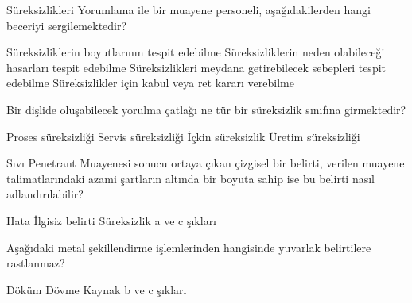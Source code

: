 \begin{question}[subtitle=]
Süreksizlikleri Yorumlama ile bir muayene personeli, aşağıdakilerden hangi beceriyi sergilemektedir?
	\begin{tasks}
          \task Süreksizliklerin boyutlarının tespit edebilme
          \task Süreksizliklerin neden olabileceği hasarları tespit edebilme
          \task Süreksizlikleri meydana getirebilecek sebepleri tespit edebilme \correct
          \task Süreksizlikler için kabul veya ret kararı verebilme
	\end{tasks}
\end{question}
\begin{solution}
	\correct
\end{solution}

\begin{question}[subtitle=]
Bir dişlide oluşabilecek yorulma çatlağı ne tür bir süreksizlik sınıfına girmektedir?
	\begin{tasks}
          \task Proses süreksizliği
          \task Servis süreksizliği \correct
          \task İçkin süreksizlik
          \task Üretim süreksizliği
	\end{tasks}
\end{question}
\begin{solution}
	\correct
\end{solution}

\begin{question}[subtitle=]
Sıvı Penetrant Muayenesi sonucu ortaya çıkan çizgisel bir belirti, verilen muayene talimatlarındaki azami şartların altında bir boyuta sahip ise bu belirti nasıl adlandırılabilir?
	\begin{tasks}
          \task Hata
          \task İlgisiz belirti
          \task Süreksizlik \correct
          \task a ve c şıkları
	\end{tasks}
\end{question}
\begin{solution}
	\correct
\end{solution}

\begin{question}[subtitle=]
Aşağıdaki metal şekillendirme işlemlerinden hangisinde yuvarlak belirtilere rastlanmaz?
	\begin{tasks}
          \task Döküm
          \task Dövme \correct
          \task Kaynak
          \task b ve c şıkları
	\end{tasks}
\end{question}
\begin{solution}
	\correct
\end{solution}

